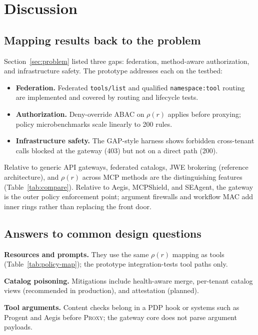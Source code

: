 \documentclass[11pt]{article}
\newcommand{\code}[1]{\texttt{#1}}
\newcommand{\aegis}{Aegis}
\newcommand{\mcpshield}{MCPShield}
\newcommand{\seagent}{SEAgent}
\begin{document}
\section{Discussion}
\label{sec:discussion}

\subsection{Mapping results back to the problem}

Section~\ref{sec:problem} listed three gaps: federation, method-aware authorization, and infrastructure safety.
The prototype addresses each on the testbed:
\begin{itemize}[leftmargin=*, itemsep=0.2em]
  \item \textbf{Federation.} Federated \code{tools/list} and qualified \code{namespace:tool} routing are implemented and covered by routing and lifecycle tests.
  \item \textbf{Authorization.} Deny-override ABAC on $\rho(r)$ applies before proxying; policy microbenchmarks scale linearly to 200 rules.
  \item \textbf{Infrastructure safety.} The GAP-style harness shows forbidden cross-tenant calls blocked at the gateway (403) but not on a direct path (200).
\end{itemize}
Relative to generic API gateways, federated catalogs, JWE brokering (reference architecture), and $\rho(r)$ across MCP methods are the distinguishing features (Table~\ref{tab:compare}).
Relative to \aegis, \mcpshield, and \seagent, the gateway is the outer policy enforcement point; argument firewalls and workflow MAC add inner rings rather than replacing the front door.

\subsection{Answers to common design questions}

\textbf{Resources and prompts.} They use the same $\rho(r)$ mapping as tools (Table~\ref{tab:policy-map}); the prototype integration-tests tool paths only.

\textbf{Catalog poisoning.} Mitigations include health-aware merge, per-tenant catalog views (recommended in production), and attestation (planned).

\textbf{Tool arguments.} Content checks belong in a PDP hook or systems such as Progent and \aegis{} before \textsc{Proxy}; the gateway core does not parse argument payloads.
\end{document}
